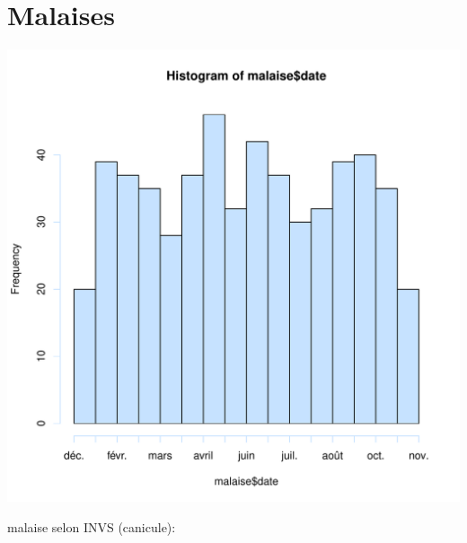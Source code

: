 \documentclass[12pt,english,french,twoside]{report}\usepackage[]{graphicx}\usepackage[]{color}
\makeatletter
\def\maxwidth{ %
  \ifdim\Gin@nat@width>\linewidth
    \linewidth
  \else
    \Gin@nat@width
  \fi
}
\newenvironment{knitrout}{}{} %
\makeatother
\begin{document}
\section{Malaises}

\begin{knitrout}
\color{fgcolor}
\includegraphics[width=\maxwidth]{figure/malaises} 

\end{knitrout}


malaise selon INVS (canicule):
\end{document}
